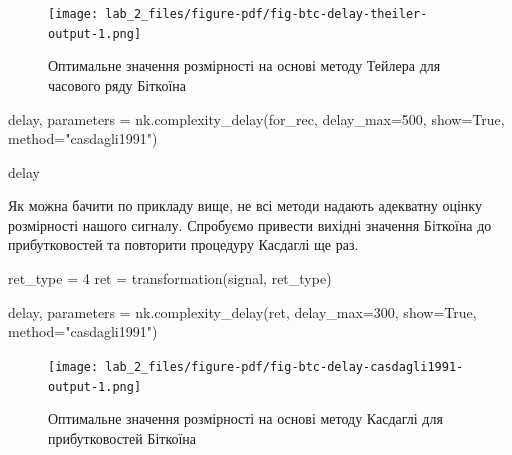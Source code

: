 \documentclass[
  letterpaper,
]{report}
\newenvironment{Shaded}{\begin{snugshade}}{\end{snugshade}}
\newcommand{\DecValTok}[1]{\textcolor[rgb]{0.68,0.00,0.00}{#1}}
\newcommand{\NormalTok}[1]{\textcolor[rgb]{0.00,0.23,0.31}{#1}}
\newcommand{\OperatorTok}[1]{\textcolor[rgb]{0.37,0.37,0.37}{#1}}
\newcommand{\StringTok}[1]{\textcolor[rgb]{0.13,0.47,0.30}{#1}}
\newcommand{\VariableTok}[1]{\textcolor[rgb]{0.07,0.07,0.07}{#1}}
\begin{document}
\begin{figure}[H]

{\centering \texttt{[image: lab\_2\_files/figure-pdf/fig-btc-delay-theiler-output-1.png]}

}

\caption{\label{fig-btc-delay-theiler}Оптимальне значення розмірності на
основі методу Тейлера для часового ряду Біткоїна}

\end{figure}

\begin{Shaded}
\begin{Highlighting}[]
\NormalTok{delay, parameters }\OperatorTok{=}\NormalTok{ nk.complexity\_delay(for\_rec, }
\NormalTok{                                        delay\_max}\OperatorTok{=}\DecValTok{500}\NormalTok{, show}\OperatorTok{=}\VariableTok{True}\NormalTok{,}
\NormalTok{                                        method}\OperatorTok{=}\StringTok{"casdagli1991"}\NormalTok{)}

\NormalTok{delay}
\end{Highlighting}
\end{Shaded}

Як можна бачити по прикладу вище, не всі методи надають адекватну оцінку
розмірності нашого сигналу. Спробуємо привести вихідні значення Біткоїна
до прибутковостей та повторити процедуру Касдаглі ще раз.

\begin{Shaded}
\begin{Highlighting}[]
\NormalTok{ret\_type }\OperatorTok{=} \DecValTok{4} 
\NormalTok{ret }\OperatorTok{=}\NormalTok{ transformation(signal, ret\_type)}
\end{Highlighting}
\end{Shaded}

\begin{Shaded}
\begin{Highlighting}[]
\NormalTok{delay, parameters }\OperatorTok{=}\NormalTok{ nk.complexity\_delay(ret, }
\NormalTok{                                        delay\_max}\OperatorTok{=}\DecValTok{300}\NormalTok{, show}\OperatorTok{=}\VariableTok{True}\NormalTok{,}
\NormalTok{                                        method}\OperatorTok{=}\StringTok{"casdagli1991"}\NormalTok{)}
\end{Highlighting}
\end{Shaded}

\begin{figure}[H]

{\centering \texttt{[image: lab\_2\_files/figure-pdf/fig-btc-delay-casdagli1991-output-1.png]}

}

\caption{\label{fig-btc-delay-casdagli1991}Оптимальне значення
розмірності на основі методу Касдаглі для прибутковостей Біткоїна}

\end{figure}
\end{document}

